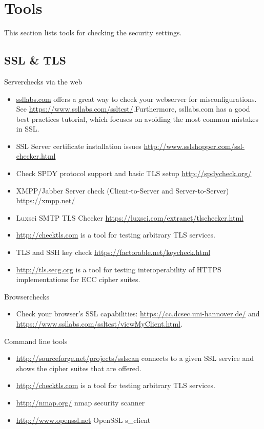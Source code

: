 \newpage
\section{Tools}
\label{section:Tools}
This section lists tools for checking the security settings.

\subsection{SSL \& TLS}

Serverchecks via the web
\begin{itemize}
\item \href{http://ssllabs.com}{ssllabs.com} offers a great way to check your webserver for misconfigurations. See \url{https://www.ssllabs.com/ssltest/}.Furthermore, ssllabs.com has a good best practices tutorial, which focuses on avoiding the most common mistakes in SSL.
\item SSL Server certificate installation issues \url{http://www.sslshopper.com/ssl-checker.html}
\item Check SPDY protocol support and basic TLS setup \url{http://spdycheck.org/}
\item XMPP/Jabber Server check (Client-to-Server and Server-to-Server) \url{https://xmpp.net/}
\item Luxsci SMTP TLS Checker \url{https://luxsci.com/extranet/tlschecker.html}
\item \url{http://checktls.com} is a tool for testing arbitrary TLS services.
\item TLS and SSH key check \url{https://factorable.net/keycheck.html}
\item \url{http://tls.secg.org} is a tool for testing interoperability of HTTPS implementations for ECC cipher suites.
\end{itemize}

Browserchecks
\begin{itemize}
\item Check your browser's SSL capabilities: \url{https://cc.dcsec.uni-hannover.de/} and \url{https://www.ssllabs.com/ssltest/viewMyClient.html}.
\end{itemize}


Command line tools
\begin{itemize}
\item \url{http://sourceforge.net/projects/sslscan} connects to a given SSL service and shows the cipher suites that are offered.
\item \url{http://checktls.com} is a tool for testing arbitrary TLS services. 
\item \url{http://nmap.org/} nmap security scanner
\item \url{http://www.openssl.net} OpenSSL s\_client
\end{itemize}


